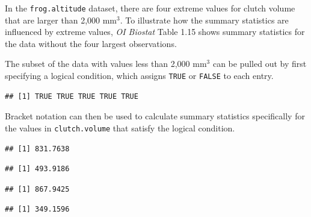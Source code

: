 In the \texttt{frog.altitude} dataset, there are four extreme values for clutch volume that are larger than 2,000 mm$^3$. To illustrate how the summary statistics are influenced by extreme values, \textit{OI Biostat} Table 1.15 shows summary statistics for the data without the four largest observations. 

The subset of the data with values less than 2,000 mm$^3$ can be pulled out by first specifying a logical condition, which assigns \texttt{TRUE} or \texttt{FALSE} to each entry. 

\begin{knitrout}
\color{fgcolor}\begin{kframe}
\begin{alltt}
 \hlkwb{=} \hlopt{$}\hlopt{<=} 

\hlstd{less.than.2000[}\hlopt{:}\hlstd{]}
\end{alltt}
\begin{verbatim}
## [1] TRUE TRUE TRUE TRUE TRUE
\end{verbatim}
\end{kframe}
\end{knitrout}

Bracket notation can then be used to calculate summary statistics specifically for the values in \texttt{clutch.volume} that satisfy the logical condition.

\begin{knitrout}
\color{fgcolor}\begin{kframe}
\begin{alltt}
\hlopt{$}
\end{alltt}
\begin{verbatim}
## [1] 831.7638
\end{verbatim}
\begin{alltt}
\hlopt{$}
\end{alltt}
\begin{verbatim}
## [1] 493.9186
\end{verbatim}
\begin{alltt}
\hlopt{$}
\end{alltt}
\begin{verbatim}
## [1] 867.9425
\end{verbatim}
\begin{alltt}
\hlopt{$}
\end{alltt}
\begin{verbatim}
## [1] 349.1596
\end{verbatim}
\end{kframe}
\end{knitrout}

